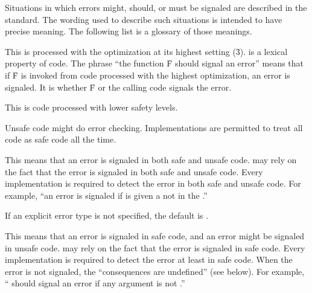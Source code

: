 \endsubsubsection%

\endsubSection%



Situations in which errors might, should, or must be signaled are described
in the standard.  The wording used to describe such situations is intended
to have precise meaning. The following list is a glossary of those meanings.

\beginlist
{}

This is  processed with the  optimization 
at its highest setting (\f{3}).   is a lexical property
of code.  The phrase ``the function \f{F} should signal an error'' 
means that if \f{F} is invoked from code processed with the highest
 optimization, an error is signaled.
It is  whether \f{F} or the calling 
code signals the error.


This is code processed with lower safety levels.
		        
Unsafe code might do error checking.  Implementations are permitted to
treat all code as safe code all the time.
                        

This means that an error is signaled in both safe and unsafe code.
 may rely on the fact that the error is signaled
in both safe and unsafe code.  Every implementation is required to
detect the error in both safe and unsafe code. For example, ``an error
is signaled if  is given a 
not  in the .''

If an explicit error type is not specified, the default is .


This means that an error is signaled in safe code, and an error
might be signaled in unsafe code.   may rely on the
fact that the error is signaled in safe code.  Every
implementation is required to detect the error at least in safe code.
When the error is not signaled, the ``consequences are undefined''
(see below).  For example, ``\funref{+} should signal an error 
if any argument is not .''

